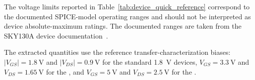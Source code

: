 \begin{designnote}
	The voltage limits reported in
	Table~\ref{tab:device_quick_reference} correspond to the documented
	SPICE-model operating ranges and should not be interpreted as device
	absolute-maximum ratings. The documented ranges are taken from the
	SKY130A device documentation~\cite{sky130_device_details}.
	
	The extracted quantities use the reference transfer-characterization
	biases: $|V_{GS}|=\qty{1.8}{\volt}$ and
	$|V_{DS}|=\qty{0.9}{\volt}$ for the standard \qty{1.8}{\volt} devices,
	$V_{GS}=\qty{3.3}{\volt}$ and $V_{DS}=\qty{1.65}{\volt}$ for the
	, and $V_{GS}=\qty{5}{\volt}$ and
	$V_{DS}=\qty{2.5}{\volt}$ for the .
\end{designnote}